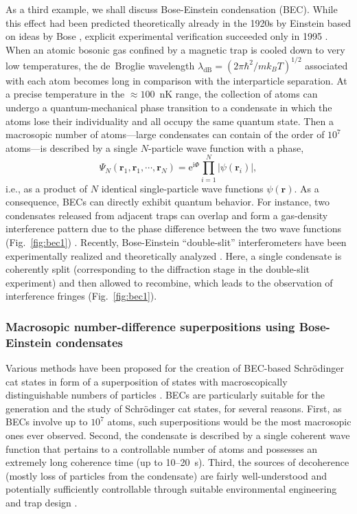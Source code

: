 \documentclass[12pt,aps,floatfix,amsmath,amssymb,showpacs,nofootinbib]{revtex4-2}
\newcommand{\be}{\begin{equation}} \newcommand{\ee}{\end{equation}}
\newcommand{\e}{\ensuremath{\mathrm{e}}}
\begin{document}
As a third example, we shall discuss Bose-Einstein condensation (BEC).
While this effect had been predicted theoretically already in the
1920s by Einstein
\cite{Einstein:1924:om,Einstein:1925:om,Einstein:1925:oy} based on
ideas by Bose \cite{Bose:1924:om}, explicit experimental verification
succeeded only in 1995
\cite{Bradley:1995:om,Davis:1995:mm,Anderson:1995:mx,Bradley:1997:nu}.
When an atomic bosonic gas confined by a magnetic trap is cooled down
to very low temperatures, the de~Broglie wavelength $\lambda_\text{dB}
= (2\pi\hbar^2/mk_BT)^{1/2}$ associated with each atom becomes long in
comparison with the interparticle separation. At a precise temperature
in the $\approx 100$~nK range, the collection of atoms can undergo a
quantum-mechanical phase transition to a condensate in which the atoms
lose their individuality and all occupy the same quantum state. Then a
macrosopic number of atoms---large condensates can contain of the
order of $10^7$ atoms---is described by a single $N$-particle wave
function with a phase,
%
\be
\Psi_N(\mathbf{r}_1, \mathbf{r}_1, \cdots
,\mathbf{r}_N) = \e^{\mathrm{i}\Phi} \prod_{i=1}^N |\psi(\mathbf{r}_i)|, 
\ee
%
i.e., as a product of $N$ identical single-particle wave functions
$\psi(\mathbf{r})$. As a consequence, BECs can directly exhibit
quantum behavior. For instance, two condensates released from adjacent
traps can overlap and form a gas-density interference pattern due to
the phase difference between the two wave functions
(Fig.~\ref{fig:bec1})
\cite{Javanainen:1996:mm,Andrews:1997:um,Rohrl:1997:pp,Javanainen:2005:mo,Saba:2005:lm}.
Recently, Bose-Einstein ``double-slit'' interferometers have been
experimentally realized \cite{Shin:2004:lo} and theoretically analyzed
\cite{Collins:2005:uu}. Here, a single condensate is coherently split
(corresponding to the diffraction stage in the double-slit experiment)
and then allowed to recombine, which leads to the observation of
interference fringes (Fig.~\ref{fig:bec1}).


\subsubsection{Macrosopic number-difference superpositions using Bose-Einstein condensates}

Various methods have been proposed for the creation of BEC-based
Schr\"odinger cat states in form of a superposition of states with
macroscopically distinguishable numbers of particles
\cite{Cirac:1998:mm,Ruostekoski:1998:mm,Gordon:1999:mh,Dunningham:2001:da,%
Calsamiglia:2001:tt,Louis:2001:mu,Micheli:2003:jn}.  BECs are
particularly suitable for the generation and the study of
Schr\"odinger cat states, for several reasons. First, as BECs involve
up to $10^7$ atoms, such superpositions would be the most macrosopic
ones ever observed.  Second, the condensate is described by a single
coherent wave function that pertains to a controllable number of atoms
and possesses an extremely long coherence time (up to 10--20~s).
Third, the sources of decoherence (mostly loss of particles from the
condensate) are fairly well-understood and potentially sufficiently
controllable through suitable environmental engineering and trap
design \cite{Ruostekoski:1998:tt,Kuang:1999:tb,Dalvit:2000:bb}.
\end{document}
